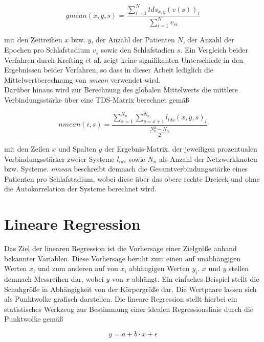 \begin{equation}
gmean(x,y,s) = \frac{\sum \limits_{i=1}^N tds_{x,y}(v(s))_i}{\sum \limits_{i=1}^N v_{si}}
	\label{eq:gmean}
\end{equation}

mit den Zeitreihen $x$ bzw. $y$, der Anzahl der Patienten $N$, der Anzahl der Epochen pro Schlafstadium $v_s$ sowie den Schlafstadien $s$. Ein Vergleich beider Verfahren durch Krefting et al. zeigt keine signifikanten Unterschiede in den Ergebnissen beider Verfahren, so dass in dieser Arbeit lediglich die Mittelwertberechnung von \textit{smean} verwendet wird. \parencite{bashan_network_2012, krefting_age_2017}\\

Darüber hinaus wird zur Berechnung des globalen Mittelwerts die mittlere Verbindungsstärke über eine \acs{TDS}-Matrix berechnet gemäß

\begin{equation}
nmean(i,s) = \frac{\sum \limits_{x=1}^{N_n} \sum \limits_{y=x+1}^{N_n} l_{tds}(x,y,s)_i }{\frac{N_{n}^2 - N_n}{2}}
	\label{eq:nmean}
\end{equation}

mit den Zeilen $x$ und Spalten $y$ der Ergebnis-Matrix, der jeweiligen prozentualen Verbindungsstärker zweier Systeme $l_{tds}$ sowie $N_n$ als Anzahl der Netzwerkknoten bzw. Systeme. \textit{nmean} beschreibt demnach die Gesamtverbindungsstärke eines Patienten pro Schlafstadium, wobei diese über das obere rechte Dreieck und ohne die Autokorrelation der Systeme berechnet wird. \parencite{krefting_age_2017}

\section{Lineare Regression}

Das Ziel der linearen Regression ist die Vorhersage einer Zielgröße anhand bekannter Variablen. Diese Vorhersage beruht zum einen auf unabhängigen Werten $x_i$ und zum anderen auf von $x_i$ abhängigen Werten $y_i$. $x$ und $y$ stellen demnach Messreihen dar, wobei $y$ von $x$ abhängt. Ein einfaches Beispiel stellt die Schuhgröße in Abhängigkeit von der Körpergröße dar. Die Wertpaare lassen sich als Punktwolke grafisch darstellen. Die lineare Regression stellt hierbei ein statistisches Werkzeug zur Bestimmung einer idealen Regressionslinie durch die Punktwolke gemäß

\begin{equation}
y = a + b \cdot x + \epsilon
	\label{eq:linreg}
\end{equation}

